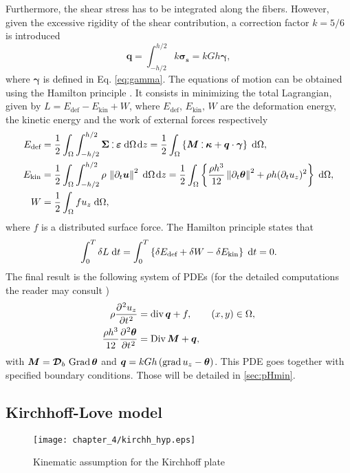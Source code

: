 Furthermore, the shear stress has to be integrated along the fibers. However, given the excessive rigidity of the shear contribution, a correction factor $k=5/6$ \cite[Chapter 10]{reddy2006theory} is introduced 
\[
\bm{q} = \int_{-h/2}^{h/2} k \bm{\sigma_s} = kGh \bm{\gamma},
\]
where $\bm{\gamma}$ is defined in Eq. \eqref{eq:gamma}. The equations of motion can be obtained using the Hamilton principle \cite[Chapter 10]{reddy2006theory}. It consists in minimizing the total Lagrangian, given by $L = E_{\text{def}} - E_{\text{kin}} + W$, where $E_{\text{def}}, \, E_{\text{kin}}, \,W$ are the deformation energy, the kinetic energy and the work of external forces respectively
\begin{align*}
E_{\text{def}} &= \frac{1}{2} \int_{\Omega} \int_{-h/2}^{h/2} \bm{\Sigma} \cddot \bm{\varepsilon} \d{\Omega} \d{z} = \frac{1}{2} \int_{\Omega} \left\{\bm{M} \cddot \bm{\kappa} + \bm{q} \cdot \bm{\gamma} \right\} \d{\Omega}, \\
E_{\text{kin}} &= \frac{1}{2}  \int_{\Omega} \int_{-h/2}^{h/2} \rho \,  \norm{\partial_t \bm{u}}^2 \d{\Omega} \d{z} = \frac{1}{2} \int_{\Omega} \left\{\frac{\rho h^3}{12} \norm{\partial_t \bm{\theta}}^2 + \rho h (\partial_t u_z)^2  \right\} \d{\Omega}, \\
W &= \frac{1}{2}  \int_{\Omega} f u_z \d{\Omega},
\end{align*}
where $f$ is a distributed surface force. The Hamilton principle states that
\[
\int_{0}^{T} \delta L \d{t} = \int_{0}^{T} \left\{ \delta E_{\text{def}} + \delta W - \delta E_{\text{kin}} \right\} \d{t} = 0.
\]
The final result is the following system of PDEs (for the detailed computations the reader may consult \cite[Chapter 10]{reddy2006theory})
\begin{equation}\label{eq:classMin}
\begin{aligned}
\rho \diffp[2]{u_z}{t} &= \div \bm{q} +  f, \qquad (x,y) \in \Omega, \\
\frac{\rho h^3}{12} \diffp[2]{\bm{\theta}}{t} &=\Div \bm{M} + \bm{q},
\end{aligned}
\end{equation}
with $\bm{M}= \bm{\mathcal{D}}_b\,\operatorname*{Grad}{\bm{\theta}}$ and $\bm{q}= kGh\,(\operatorname*{grad} u_z - \bm{\theta})$. This PDE goes together with specified boundary conditions. Those will be detailed in \ref{sec:pHmin}.


\subsection{Kirchhoff-Love model}
\begin{figure}[tb]
	\centering
	\texttt{[image: chapter\_4/kirchh\_hyp.eps]}
	\caption{Kinematic assumption for the Kirchhoff plate}
	\label{fig:kirchh_hyp}
\end{figure}

